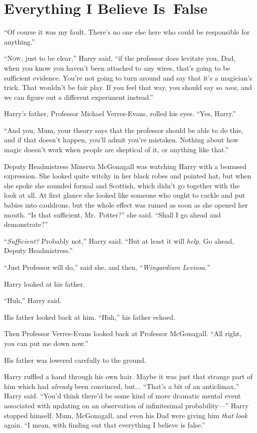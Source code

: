 \chapter{Everything I Believe Is~False}

\epigraph{“Of course it was my fault. There’s no one else here who could be responsible for anything.”}{}

\lettrine{“N}{ow}, just to be clear,” Harry said, “if the professor does levitate you, Dad, when you know you haven’t been attached to any wires, that’s going to be sufficient evidence. You’re not going to turn around and say that it’s a magician’s trick. That wouldn’t be fair play. If you feel that way, you should say so \emph{now}, and we can figure out a different experiment instead.”

Harry’s father, Professor Michael Verres-Evans, rolled his eyes. “Yes, Harry.”

“And you, Mum, your theory says that the professor should be able to do this, and if that doesn’t happen, you’ll admit you’re mistaken. Nothing about how magic doesn’t work when people are skeptical of it, or anything like that.”

Deputy Headmistress Minerva McGonagall was watching Harry with a bemused expression. She looked quite witchy in her black robes and pointed hat, but when she spoke she sounded formal and Scottish, which didn’t go together with the look at all. At first glance she looked like someone who ought to cackle and put babies into cauldrons, but the whole effect was ruined as soon as she opened her mouth. “Is that sufficient, Mr.~Potter?” she said. “Shall I go ahead and demonstrate?”

“\emph{Sufficient?} Probably not,” Harry said. “But at least it will \emph{help.} Go ahead, Deputy Headmistress.”

“Just Professor will do,” said she, and then, “\emph{Wingardium Leviosa.}”

Harry looked at his father.

“Huh,” Harry said.

His father looked back at him. “Huh,” his father echoed.

Then Professor Verres-Evans looked back at Professor McGonagall. “All right, you can put me down now.”

His father was lowered carefully to the ground.

Harry ruffled a hand through his own hair. Maybe it was just that strange part of him which had \emph{already} been convinced, but... “That’s a bit of an anticlimax,” Harry said. “You’d think there’d be some kind of more dramatic mental event associated with updating on an observation of infinitesimal probability—” Harry stopped himself. Mum, McGonagall, and even his Dad were giving him \emph{that look} again. “I mean, with finding out that everything I believe is false.”

